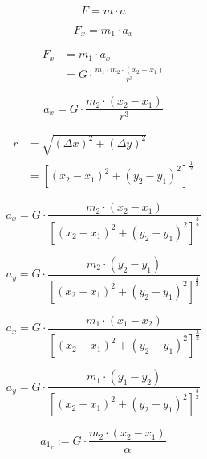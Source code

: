 \documentclass[10pt,twocolumn]{scrartcl}
\begin{document}
\begin{equation}F = m \cdot a
\label{eq:9}
\end{equation}

\begin{equation}F_x = m_1 \cdot a_x
\label{eq:10}
\end{equation}

\begin{equation}
	\begin{aligned}
		F_x {} & = m_1 \cdot a_x \\
  			& = G \cdot \frac{m_1 \cdot m_2 \cdot (x_2 - x_1)}{r^3}
	\end{aligned}
\label{eq:11}
\end{equation}

\begin{equation}a_x = G \cdot \frac{m_2 \cdot (x_2 - x_1)}{r^3}
\label{eq:12}
\end{equation}

\begin{equation}
	\begin{aligned}
		r {} & = \sqrt{(\Delta x)^2 + (\Delta y)^2} \\
  			& = [(x_2-x_1)^2 + (y_2-y_1)^2]^\frac{1}{2}
	\end{aligned}
\label{eq:13}
\end{equation}

\begin{equation}a_x = G \cdot \frac{m_2 \cdot (x_2 - x_1)}
									{[(x_2-x_1)^2 + (y_2-y_1)^2]^\frac{3}{2}}
\label{eq:14}
\end{equation}

\begin{equation}a_y = G \cdot \frac{m_2 \cdot (y_2 - y_1)}
									{[(x_2-x_1)^2 + (y_2-y_1)^2]^\frac{3}{2}}
\label{eq:15}
\end{equation}

\begin{equation}a_x = G \cdot \frac{m_1 \cdot (x_1 - x_2)}
								{[(x_2-x_1)^2 + (y_2-y_1)^2]^\frac{3}{2}}
\label{eq:16}
\end{equation}

\begin{equation}a_y = G \cdot \frac{m_1 \cdot (y_1 - y_2)}
									{[(x_2-x_1)^2 + (y_2-y_1)^2]^\frac{3}{2}}
\label{eq:17}
\end{equation}

\begin{equation}a_{1_x} := G \cdot \frac{m_2 \cdot (x_2 - x_1)}
			{\alpha}
\label{eq:18}
\end{equation}
\end{document}
